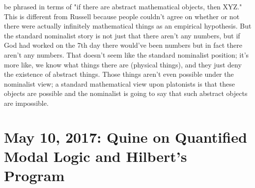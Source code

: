 \documentclass[12pt]{article}
\theoremstyle{definition}
\begin{document}
\begin{enumerate}
        be phrased in terms of "if there are abstract mathematical objects,
        then XYZ." This is different from Russell because people couldn't agree
        on whether or not there were actually infinitely mathematical things as
        an empirical hypothesis. But the standard nominalist story is not just
        that there aren't any numbers, but if God had worked on the 7th day
        there would've been numbers but in fact there aren't any numbers. That
        doesn't seem like the standard nominalist position; it's more like, we
        know what things there are (physical things), and they just deny the
        existence of abstract things. Those things aren't even possible under
        the nominalist view; a standard mathematical view upon platonists is
        that these objects are possible and the nominalist is going to say that
        such abstract objects are impossible.

\end{enumerate}

\section{May 10, 2017: Quine on Quantified Modal Logic and Hilbert's Program}
\end{document}
